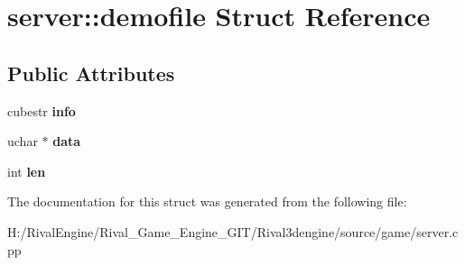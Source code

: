 \hypertarget{structserver_1_1demofile}{}\section{server\+:\+:demofile Struct Reference}
\label{structserver_1_1demofile}
\subsection*{Public Attributes}
\begin{DoxyCompactItemize}
\item 
\mbox{\label{structserver_1_1demofile_aeb45d37141ea1a970fcdadb4f09781ae}} 
cubestr {\bfseries info}
\item 
\mbox{\label{structserver_1_1demofile_a5598218d015c55ec015ae85acfe2b0e4}} 
uchar $\ast$ {\bfseries data}
\item 
\mbox{\label{structserver_1_1demofile_a281eee4ee213dd3461379bf8c374feaf}} 
int {\bfseries len}
\end{DoxyCompactItemize}


The documentation for this struct was generated from the following file\+:\begin{DoxyCompactItemize}
\item 
H\+:/\+Rival\+Engine/\+Rival\+\_\+\+Game\+\_\+\+Engine\+\_\+\+G\+I\+T/\+Rival3dengine/source/game/server.\+cpp\end{DoxyCompactItemize}
